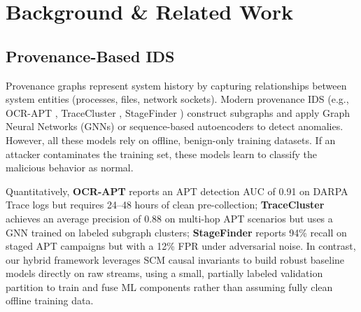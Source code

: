 \section{Background \& Related Work}

\subsection{Provenance-Based IDS}
Provenance graphs represent system history by capturing relationships between system entities (processes, files, network sockets). Modern provenance IDS (e.g., OCR-APT \cite{ocrapt2025}, TraceCluster \cite{tracecluster2026}, StageFinder \cite{stagefinder2026}) construct subgraphs and apply Graph Neural Networks (GNNs) or sequence-based autoencoders to detect anomalies. However, all these models rely on offline, benign-only training datasets. If an attacker contaminates the training set, these models learn to classify the malicious behavior as normal.

Quantitatively, \textbf{OCR-APT} \cite{ocrapt2025} reports an APT detection AUC of 0.91 on DARPA Trace logs but requires 24--48 hours of clean pre-collection; \textbf{TraceCluster} \cite{tracecluster2026} achieves an average precision of 0.88 on multi-hop APT scenarios but uses a GNN trained on labeled subgraph clusters; \textbf{StageFinder} \cite{stagefinder2026} reports 94\% recall on staged APT campaigns but with a 12\% FPR under adversarial noise. In contrast, our hybrid framework leverages SCM causal invariants to build robust baseline models directly on raw streams, using a small, partially labeled validation partition to train and fuse ML components rather than assuming fully clean offline training data.

